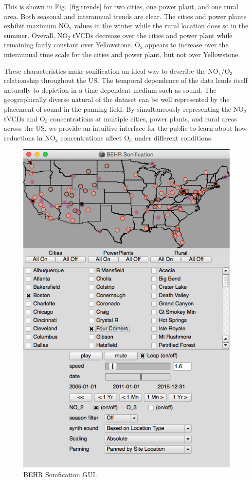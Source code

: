 \documentclass[a4paper,10pt,oneside]{article}
\newcommand{\ce}[1]{$\mathrm{#1}$}
\begin{document}
\begin{sloppy}
This is shown in Fig.~\ref{fig:trends} for two cities, one power plant, and one rural area. Both seasonal and interannual trends are clear. The cities and power plants exhibit maximum \ce{NO_2} values in the winter while the rural location does so in the summer. Overall, \ce{NO_2} tVCDs decrease over the cities and power plant while remaining fairly constant over Yellowstone. \ce{O_3} appears to increase over the interannual time scale for the cities and power plant, but not over Yellowstone. 

These characteristics make sonification an ideal way to describe the \ce{NO_x}/\ce{O_3} relationship throughout the US. The temporal dependence of the data lends itself naturally to depiction in a time-dependent medium such as sound. The geographically diverse natural of the dataset can be well represented by the placement of sound in the panning field. By simultaneously representing the \ce{NO_2} tVCDs and \ce{O_3} concentrations at multiple cities, power plants, and rural areas across the US, we provide an intuitive interface for the public to learn about how reductions in \ce{NO_x} concentrations affect \ce{O_3} under different conditions.
	
\begin{figure}[t]
\centering
\includegraphics[width=0.95\columnwidth]{figs/gui_revised.png}
\caption{BEHR Sonification GUI.}
\label{fig:gui}
\end{figure}


\end{sloppy}
\end{document}
